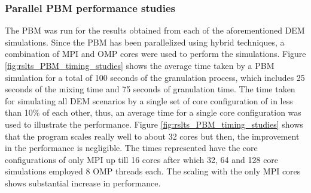 \documentclass[preprint,11pt,authoryear]{elsarticle}
\begin{document}
\subsubsection{Parallel PBM performance studies}
 The PBM was run for the results obtained from each of the aforementioned DEM simulations. 
Since the PBM has been parallelized using hybrid techniques, a combination of MPI and OMP cores 
were used to perform the simulations. Figure \ref{fig:rslts_PBM_timing_studies} shows the average time 
taken by a PBM simulation for a total of 100 seconds of the granulation process, which includes 25 
seconds of the mixing time and 75 seconds of granulation time. The time taken for simulating all DEM 
scenarios by a single set of core configuration of in less than 10\% of each other, thus, an  average 
time for a single core configuration was used to illustrate the performance. Figure 
\ref{fig:rslts_PBM_timing_studies} shows that the program scales really well to about 32 cores but then, 
the improvement in the performance is negligible. The times represented have the core configurations 
of only MPI up till 16 cores after which 32, 64 and 128 core simulations employed 8 OMP threads 
each. The scaling with the only MPI cores shows substantial increase in performance. \\
\end{document}
